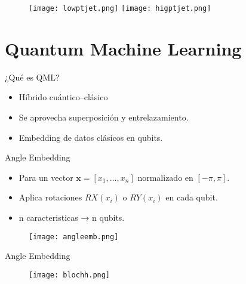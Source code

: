 \documentclass{beamer}
\begin{document}
\begin{frame}
    \begin{figure}
    \centering
    \texttt{[image: lowptjet.png]}
    \texttt{[image: higptjet.png]}
  \end{figure}
\end{frame}

\section{Quantum Machine Learning}
\begin{frame}{¿Qué es QML?}
  \begin{itemize}
    \item Híbrido cuántico–clásico
    \item Se aprovecha superposición y entrelazamiento.
    \item Embedding de datos clásicos en qubits.
  \end{itemize}
\end{frame}

\begin{frame}{Angle Embedding}
  \begin{itemize}
    \item Para un vector $\mathbf{x}=[x_1,\dots,x_n]$ normalizado en $[-\pi,\pi]$.
    \item Aplica rotaciones $RX(x_i)$ o $RY(x_i)$ en cada qubit.
    \item n caracteristicas → n qubits.
  \end{itemize}
  \vspace{1em}
  \begin{figure}
    \centering
    \texttt{[image: angleemb.png]}
  \end{figure}
\end{frame}

\begin{frame}{Angle Embedding}
  \begin{figure}
    \texttt{[image: blochh.png]}
  \end{figure}
\end{frame}
\end{document}
